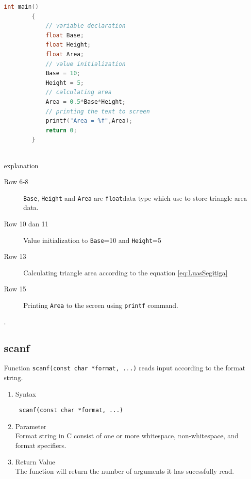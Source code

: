 \begin{description}
\begin{lstlisting}[language=c,captionpos=t]
		int main()
		{
			// variable declaration
			float Base;
			float Height;
			float Area;
			// value initialization
			Base = 10;
			Height = 5;
			// calculating area
			Area = 0.5*Base*Height;
			// printing the text to screen
			printf("Area = %f",Area);
			return 0;
		}
		
	\end{lstlisting}
	
	explanation
	\begin{description}
		\item[Row 6-8]  \verb|Base|, \verb|Height| and \verb|Area| are \verb|float|data type which use to store triangle area data.
		\item[Row 10 dan 11] Value initialization to \verb|Base|=10 and \verb|Height|=5
		\item[Row 13] Calculating triangle area according to  the equation \ref{eq:LuasSegitiga}
		\item[Row 15] Printing \verb|Area| to the screen using \verb|printf| command.
	\end{description}
\end{description}

.\subsection{scanf}
Function \verb*|scanf(const char *format, ...)| reads input according to the format string.

\begin{enumerate}
	\item Syntax 
	\begin{verbatim} scanf(const char *format, ...)
	\end{verbatim}
	\item Parameter \\
	Format string in C consist of one or more whitespace, non-whitespace, and format specifiers.
	\item Return Value \\
	The function will return the number of arguments it has sucessfully read.
	
\end{enumerate}

